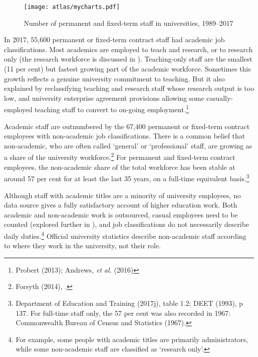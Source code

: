 \documentclass{grattan}
\begin{document}
    \begin{figure} %
    \caption{Number of permanent and fixed-term staff in universities, 1989--2017}\label{fig:number-of-permanent-and-fixedterm-staff-in-universities-19892017}
    \texttt{[image: atlas/mycharts.pdf]}
    \end{figure}
In 2017, 55,600 permanent or fixed-term contract staff had academic job classifications. Most academics are employed to teach and research, or to research only (the research workforce is discussed in ). Teaching-only staff are the smallest (11 per cent) but fastest growing part of the academic workforce. Sometimes this growth reflects a genuine university commitment to teaching. But it also explained by reclassifying teaching and research staff whose research output is too low, and university enterprise agreement provisions allowing some casually-employed teaching staff to convert to on-going employment.\footnote{Probert (2013); Andrews\emph{, et al.} (2016)}

Academic staff are outnumbered by the 67,400 permanent or fixed-term contract employees with non-academic job classifications. There is a common belief that non-academic, who are often called `general' or `professional' staff, are growing as a share of the university workforce.\footnote{Forsyth (2014), .} For permanent and fixed-term contract employees, the non-academic share of the total workforce has been stable at around 57 per cent for at least the last 35 years, on a full-time equivalent basis.\footnote{Department of Education and Training (2017j), table 1.2; DEET (1993), p 137. For full-time staff only, the 57 per cent was also recorded in 1967: Commonwealth Bureau of Census and Statistics (1967).}

Although staff with academic titles are a minority of university employees, no data source gives a fully satisfactory account of higher education work. Both academic and non-academic work is outsourced, casual employees need to be counted (explored further in ), and job classifications do not necessarily describe daily duties.\footnote{For example, some people with academic titles are primarily administrators, while some non-academic staff are classified as `research only'.} Official university statistics describe non-academic staff according to where they work in the university, not their role.
\end{document}
